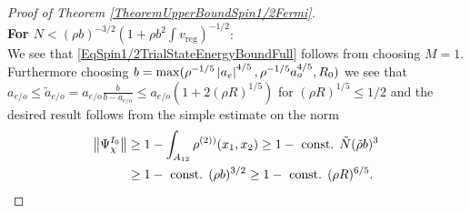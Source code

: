 \begin{proof}[Proof of Theorem \ref{TheoremUpperBoundSpin1/2Fermi}]
\begin{equation}
	\end{equation}
	\textbf{For $ N<(\rho b)^{-3/2}\left(1+\rho b^2\int v_{\text{reg}}\right)^{-1/2} $}:\\
	We see that \eqref{EqSpin1/2TrialStateEnergyBoundFull} follows from choosing $ M=1 $.\\
	Furthermore choosing $ b=\max(\rho^{-1/5}\left\lvert a_e \right\rvert^{4/5},\rho^{-1/5}a_o^{4/5},R_0) $ we see that $ a_{e/o}\leq \tilde{a}_{e/o}=a_{e/o}\frac{b}{b-a_{e/o}}\leq a_{e/o}\left(1+2(\rho R)^{1/5}\right) $ for $ (\rho R)^{1/5}\leq 1/2 $ and the desired result follows from the simple estimate on the norm\begin{equation}
	\begin{aligned}
	\left\lVert \Psi^{I_0}_{\chi} \right\rVert&\geq 1-\int_{A_{12}} \rho^{(2))}(x_1,x_2)\geq 1-\text{ const. }\tilde{N}(\tilde{\rho}b)^3\\&\geq 1-\text{ const. }(\rho b)^{3/2}\geq 1-\text{ const. }(\rho R)^{6/5}.
	\end{aligned}
	\end{equation}
\end{proof}



